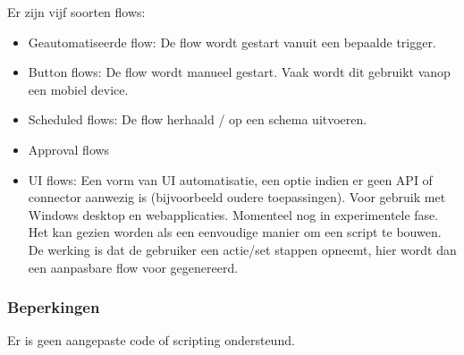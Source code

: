 Er zijn vijf soorten flows:
\begin{itemize}
    \item Geautomatiseerde flow: De flow wordt gestart vanuit een bepaalde trigger.
    \item Button flows: De flow wordt manueel gestart. Vaak wordt dit gebruikt vanop een mobiel device.
    \item Scheduled flows: De flow herhaald / op een schema uitvoeren.
    \item Approval flows
    \item UI flows: Een vorm van UI automatisatie, een optie indien er geen API of connector aanwezig is (bijvoorbeeld oudere toepassingen). Voor gebruik met Windows desktop en webapplicaties. Momenteel nog in experimentele fase. Het kan gezien worden als een eenvoudige manier om een script te bouwen. De werking is dat de gebruiker een actie/set stappen opneemt, hier wordt dan een aanpasbare flow voor gegenereerd. \autocite{MPA2019}
\end{itemize}

\subsubsection{Beperkingen}

Er is geen aangepaste code of scripting ondersteund. %